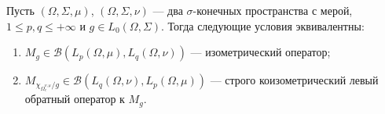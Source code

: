 \begin{proposition}\label{IsomMultOpDescBtwnTwoMeasSp} Пусть
$(\Omega,\Sigma,\mu)$, $(\Omega,\Sigma,\nu)$ --- два $\sigma$-конечных
пространства с мерой, $1\leq p,q\leq +\infty$ и $g\in L_0(\Omega,\Sigma)$. Тогда
следующие условия эквивалентны:

\begin{enumerate}[label = (\roman*)]
    \item $M_g\in\mathcal{B}(L_p(\Omega,\mu),L_q(\Omega,\nu))$ --- 
    изометрический оператор;

    \item $M_{\chi_{\Omega_c^{\nu,\mu}}/g}\in\mathcal{B}(L_q(\Omega,\nu),
    L_p(\Omega,\mu))$ --- строго коизометрический левый 
    обратный оператор к $M_g$.
\end{enumerate}
\end{proposition}

